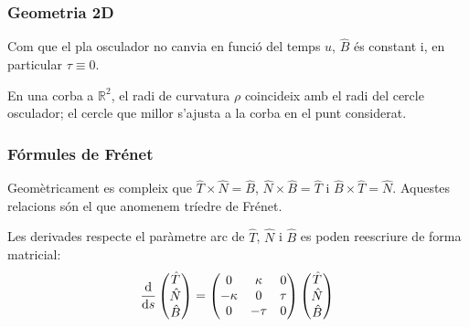\subsubsection*{Geometria 2D}
Com que el pla osculador no canvia en funció del temps $u$, $\hat{B}$ és constant i, en particular $\tau \equiv 0$.

En una corba a $\mathbb{R}^{2}$, el radi de curvatura $\rho$ coincideix amb el radi del cercle osculador; el cercle que millor s'ajusta a la corba en el punt considerat.

\subsubsection*{Fórmules de Frénet}
\begin{defi}
    Geomètricament es compleix que $\hat{T} \times \hat{N} = \hat{B}$, $\hat{N} \times \hat{B} = \hat{T}$ i $\hat{B} \times \hat{T} = \hat{N}$. Aquestes relacions són el que anomenem tríedre de Frénet.
\end{defi}
Les derivades respecte el paràmetre arc de $\hat{T}$, $\hat{N}$ i $\hat{B}$ es poden reescriure de forma matricial:
\begin{align}
    \frac{\mathrm{d}}{\mathrm{d} s} \begin{pmatrix} \hat{T} \\ \hat{N} \\ \hat{B} \end{pmatrix} = \begin{pmatrix} 0 & \kappa & 0 \\ - \kappa & 0 & \tau \\ 0 & - \tau & 0 \end{pmatrix} \begin{pmatrix} \hat{T} \\ \hat{N} \\ \hat{B} \end{pmatrix}
\end{align}

